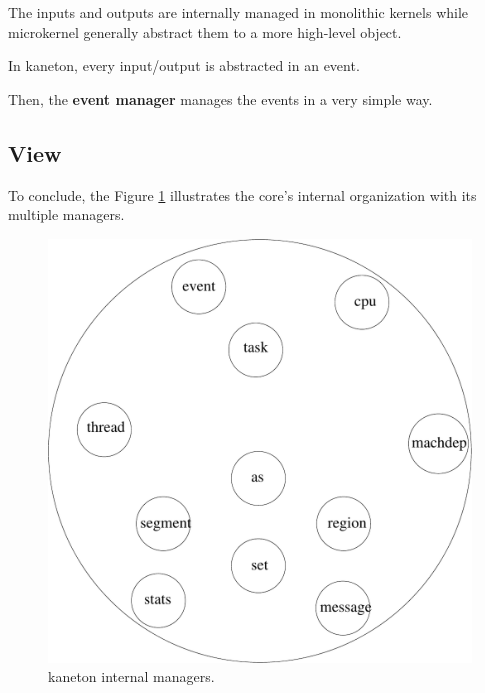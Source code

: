 The inputs and outputs are internally managed in monolithic
kernels while microkernel generally abstract them to a more high-level
object.

In kaneton, every input/output is abstracted in an event.

Then, the \textbf{event manager} manages the events in a very simple way.

%
%

\subsection{View}

To conclude, the Figure \ref{figure:overview_kaneton} illustrates the core's
internal organization with its multiple managers.

\begin{figure}[h]
  \begin{center}
    \includegraphics[scale=0.5]{figures/overview_kaneton.pdf}
    \caption{kaneton internal managers.}
    \label{figure:overview_kaneton}
  \end{center}
\end{figure}
